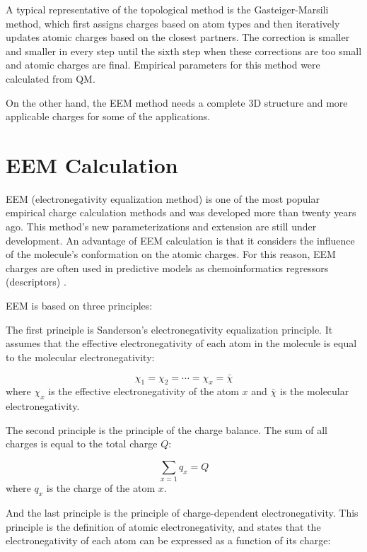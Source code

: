 A typical representative of the topological method is the Gasteiger-Marsili
method, which first assigns charges based on atom types and then iteratively
updates atomic charges based on the closest partners. The correction is smaller
and smaller in every step until the sixth step when these corrections are too
small and atomic charges are final. Empirical parameters for this method were
calculated from QM. 

On the other hand, the EEM method needs a complete 3D structure and more
applicable charges for some of the applications.

\section{EEM Calculation}

EEM (electronegativity equalization method) \cite{Mortier1986} is one of the
most popular empirical charge calculation methods and was developed more than
twenty years ago. This method's new parameterizations \cite{Mortier1986, Baekelandt1991, 
Bultinck2002, Bultinck2004, Chaves2006, Svobodova2007, Jirouskova2009, Ouyang2009} and
extension \cite{Chaves2006, Yang1997} are still under development. An advantage of EEM
calculation is that it considers the influence of the molecule's conformation
on the atomic charges. For this reason, EEM charges are often used
in predictive models as chemoinformatics regressors (descriptors) \cite{Todoschini2009}.

EEM is based on three principles: 

The first principle is Sanderson's electronegativity equalization principle.
It assumes that the effective electronegativity of each atom in the molecule
is equal to the molecular electronegativity:

\begin{equation}
    \chi_1 = \chi_2 = \cdots = \chi_x = \bar{\chi} 
\end{equation}
where $\chi_x$ is the effective electronegativity of the atom $x$ and
$\bar{\chi}$ is the molecular electronegativity.

The second principle is the principle of the charge balance. The sum of all
charges is equal to the total charge $Q$:

\begin{equation}
    \sum_{x=1} q_x = Q
\end{equation}
where $q_x$ is the charge of the atom $x$.

And the last principle is the principle of charge-dependent electronegativity.
This principle is the definition of atomic electronegativity, and states that
the electronegativity of each atom can be expressed as a function of its charge: 

